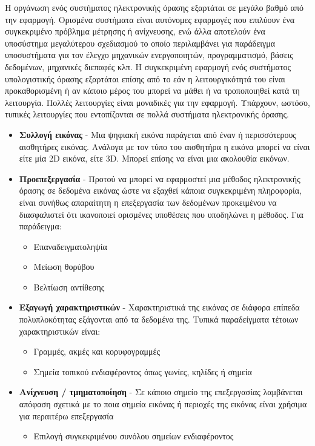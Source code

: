 Η οργάνωση ενός συστήματος ηλεκτρονικής όρασης εξαρτάται σε μεγάλο βαθμό από την εφαρμογή. Ορισμένα συστήματα είναι αυτόνομες εφαρμογές που επιλύουν ένα συγκεκριμένο πρόβλημα μέτρησης ή ανίχνευσης, ενώ άλλα αποτελούν ένα υποσύστημα μεγαλύτερου σχεδιασμού το οποίο περιλαμβάνει για παράδειγμα υποσυστήματα για τον έλεγχο μηχανικών ενεργοποιητών, προγραμματισμό, βάσεις δεδομένων, μηχανικές διεπαφές κλπ. Η συγκεκριμένη εφαρμογή ενός συστήματος υπολογιστικής όρασης εξαρτάται επίσης από το εάν η λειτουργικότητά του είναι προκαθορισμένη ή αν κάποιο μέρος του μπορεί να μάθει ή να τροποποιηθεί κατά τη λειτουργία. Πολλές λειτουργίες είναι μοναδικές για την εφαρμογή. Υπάρχουν, ωστόσο, τυπικές λειτουργίες που εντοπίζονται σε πολλά συστήματα ηλεκτρονικής όρασης.
\begin{itemize}
	\item \textbf{Συλλογή εικόνας} - Μια ψηφιακή εικόνα παράγεται από έναν ή περισσότερους αισθητήρες εικόνας. Ανάλογα με τον τύπο του αισθητήρα η εικόνα μπορεί να είναι είτε μία 2D εικόνα, είτε 3D. Μπορεί επίσης να είναι μια ακολουθία εικόνων.
	\item \textbf{Προεπεξεργασία} - Προτού να μπορεί να εφαρμοστεί μια μέθοδος ηλεκτρονικής όρασης σε δεδομένα εικόνας ώστε να εξαχθεί κάποια συγκεκριμένη πληροφορία, είναι συνήθως απαραίτητη η επεξεργασία των δεδομένων προκειμένου να διασφαλιστεί ότι ικανοποιεί ορισμένες υποθέσεις που υποδηλώνει η μέθοδος. Για παράδειγμα:
	\begin{itemize}
		\item Επαναδειγματοληψία
		\item Μείωση θορύβου
		\item Βελτίωση αντίθεσης
	\end{itemize}
	\item \textbf{Εξαγωγή χαρακτηριστικών} - Χαρακτηριστικά της εικόνας σε διάφορα επίπεδα πολυπλοκότητας εξάγονται από τα δεδομένα της. Τυπικά παραδείγματα τέτοιων χαρακτηριστικών είναι:
	\begin{itemize}
		\item Γραμμές, ακμές και κορυφογραμμές
		\item Σημεία τοπικού ενδιαφέροντος όπως γωνίες, κηλίδες ή σημεία
	\end{itemize}
	\item \textbf{Ανίχνευση / τμηματοποίηση} - Σε κάποιο σημείο της επεξεργασίας λαμβάνεται απόφαση σχετικά με το ποια σημεία εικόνας ή περιοχές της εικόνας είναι χρήσιμα για περαιτέρω επεξεργασία
	\begin{itemize}
		\item Επιλογή συγκεκριμένου συνόλου σημείων ενδιαφέροντος

\end{itemize}
\end{itemize}
